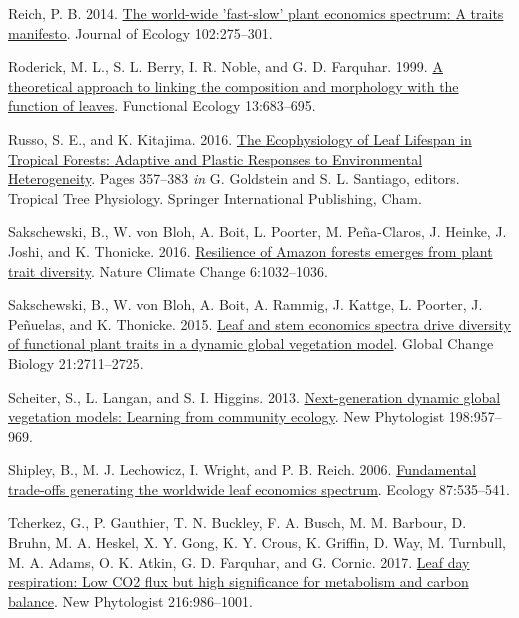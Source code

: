 \documentclass[
  12pt,
]{article}
\newlength{\cslhangindent} %
\newlength{\cslentryspacingunit} %
\newenvironment{CSLReferences}[2] %
 {%
  \setlength{\parindent}{0pt} %
  \ifodd #1 %
  \let\oldpar\par %
  \def\par{\hangindent=\cslhangindent\oldpar} %
  \fi %
  \setlength{\parskip}{#2\cslentryspacingunit} %
 }%
 {} %
\begin{document}
\begin{CSLReferences}{1}{0}
\leavevmode{}%
Reich, P. B. 2014. \href{https://doi.org/10.1111/1365-2745.12211}{The world-wide 'fast-slow' plant economics spectrum: {A} traits manifesto}. Journal of Ecology 102:275--301.

\leavevmode{}%
Roderick, M. L., S. L. Berry, I. R. Noble, and G. D. Farquhar. 1999. \href{https://doi.org/10.1046/j.1365-2435.1999.00368.x}{A theoretical approach to linking the composition and morphology with the function of leaves}. Functional Ecology 13:683--695.

\leavevmode{}%
Russo, S. E., and K. Kitajima. 2016. \href{https://doi.org/10.1007/978-3-319-27422-5_17}{The {Ecophysiology} of {Leaf Lifespan} in {Tropical Forests}: {Adaptive} and {Plastic Responses} to {Environmental Heterogeneity}}. Pages 357--383 \emph{in} G. Goldstein and S. L. Santiago, editors. Tropical {Tree Physiology}. {Springer International Publishing}, {Cham}.

\leavevmode{}%
Sakschewski, B., W. von Bloh, A. Boit, L. Poorter, M. Peña-Claros, J. Heinke, J. Joshi, and K. Thonicke. 2016. \href{https://doi.org/10.1038/nclimate3109}{Resilience of {Amazon} forests emerges from plant trait diversity}. Nature Climate Change 6:1032--1036.

\leavevmode{}%
Sakschewski, B., W. von Bloh, A. Boit, A. Rammig, J. Kattge, L. Poorter, J. Peñuelas, and K. Thonicke. 2015. \href{https://doi.org/10.1111/gcb.12870}{Leaf and stem economics spectra drive diversity of functional plant traits in a dynamic global vegetation model}. Global Change Biology 21:2711--2725.

\leavevmode{}%
Scheiter, S., L. Langan, and S. I. Higgins. 2013. \href{https://doi.org/10.1111/nph.12210}{Next-generation dynamic global vegetation models: {Learning} from community ecology}. New Phytologist 198:957--969.

\leavevmode{}%
Shipley, B., M. J. Lechowicz, I. Wright, and P. B. Reich. 2006. \href{https://doi.org/10.1890/05-1051}{Fundamental trade-offs generating the worldwide leaf economics spectrum}. Ecology 87:535--541.

\leavevmode{}%
Tcherkez, G., P. Gauthier, T. N. Buckley, F. A. Busch, M. M. Barbour, D. Bruhn, M. A. Heskel, X. Y. Gong, K. Y. Crous, K. Griffin, D. Way, M. Turnbull, M. A. Adams, O. K. Atkin, G. D. Farquhar, and G. Cornic. 2017. \href{https://doi.org/10.1111/nph.14816}{Leaf day respiration: Low {CO2} flux but high significance for metabolism and carbon balance}. New Phytologist 216:986--1001.


\end{CSLReferences}
\end{document}
